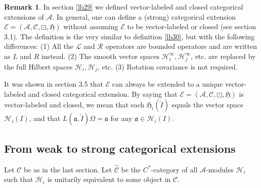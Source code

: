 \documentclass[12pt,a4paper]{article}
\theoremstyle{definition}
\newtheorem{rem}[df]{Remark}
\theoremstyle{plain}
\newcommand{\fk}{\mathfrak}
\newcommand{\mc}{\mathcal}
\newcommand{\wtd}{\widetilde}
\newcommand{\wht}{\widehat}
\newcommand{\scr}{\mathscr}
\numberwithin{equation}{subsection}
\begin{document}
\begin{rem}
In section \ref{lb29} we defined vector-labeled and closed categorical extensions of $\mc A$. In general, one can define a (strong) categorical extension $\scr E=(\mc A,\scr C,\boxdot,\fk H)$  without assuming $\scr E$ to be vector-labeled or closed (see \cite{Gui21a} section 3.1). The definition is the very similar to definition \ref{lb30}, but with the following differences: (1) All the $\mc L$ and $\mc R$ operators are bounded operators and are written as $L$ and $R$ instead. (2) The smooth vector spaces $\mc H_i^\infty,\mc H_j^\infty$, etc. are replaced by the full Hilbert spaces $\mc H_i,\mc H_j$, etc. (3) Rotation covariance is not required. 

It was shown in \cite{Gui21a} section 3.5 that $\scr E$ can always be extended to a unique vector-labeled and closed categorical extension. By saying that $\scr E=(\mc A,\scr C,\boxdot,\fk H)$ is vector-labeled and closed, we mean that each $\fk H_i(\wtd I)$ equals the vector space $\mc H_i(I)$, and  that $L(\fk a,\wtd I)\Omega=\fk a$ for any $\fk a\in\mc H_i(I)$. 
\end{rem}


\subsection{From weak to strong categorical extensions}\label{lb70}

Let $\scr C$ be as in the last section.  Let $\wht {\scr C}$ be the $C^*$-category of all $\mc A$-modules $\mc H_i$ such that $\mc H_i$ is  unitarily equivalent to some object in $\scr C$. 
\end{document}
